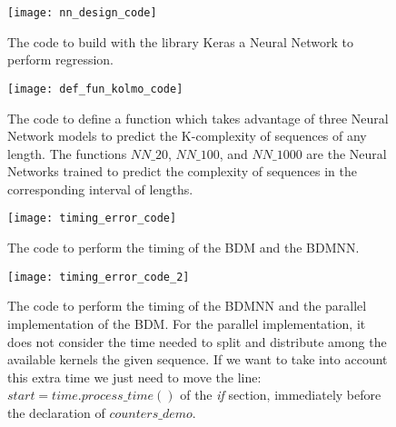 \begin{figure}[h]
	\centering
		\texttt{[image: nn\_design\_code]}
	\caption{The code to build with the library Keras a Neural Network to perform regression.}
	\label{fig:nn_design_code}
\end{figure}

\begin{figure}[h]
	\centering
		\texttt{[image: def\_fun\_kolmo\_code]}
	\caption[The code to define a function which takes advantage of three Neural Network models to predict the K-complexity of sequences of any length.]{The code to define a function which takes advantage of three Neural Network models to predict the K-complexity of sequences of any length. The functions $NN \_20$, $NN \_100$, and $NN \_1000$ are the Neural Networks trained to predict the complexity of sequences in the corresponding interval of lengths.}
	\label{fig:def_fun_kolmo_code}
\end{figure}

\begin{figure}[h]
	\centering
		\texttt{[image: timing\_error\_code]}
	\caption{The code to perform the timing of the BDM and the BDMNN.}
	\label{fig:timing_error_code}
\end{figure}

\begin{figure}[h]
	\centering
		\texttt{[image: timing\_error\_code\_2]}
	\caption[The code to perform the timing of the BDMNN and the parallel implementation of the BDM.]{The code to perform the timing of the BDMNN and the parallel implementation of the BDM. For the parallel implementation, it does not consider the time needed to split and distribute among the available kernels the given sequence. If we want to take into account this extra time we just need to move the line: $start = time.process \_ time()$ of the \textit{if} section, immediately before the declaration of $counters \_ demo$.}
	\label{fig:timing_error_code_2}
\end{figure}

